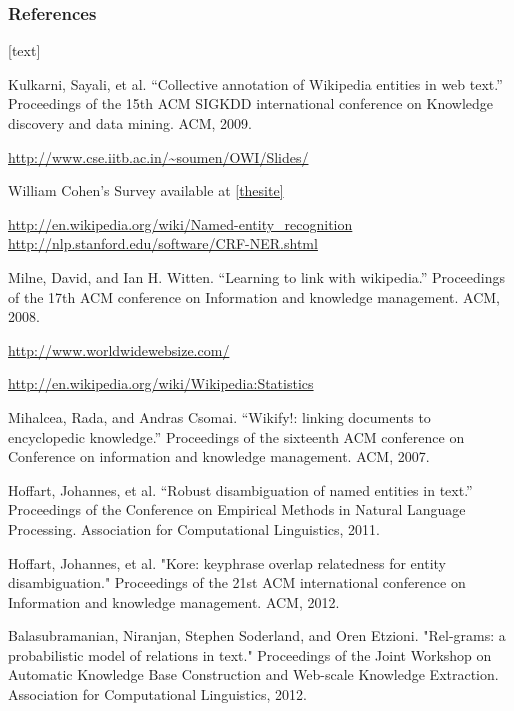 
\begin{frame}[allowframebreaks]
\frametitle{References}
[text]
\begin{thebibliography}{9}

 \label{thepaper} Kulkarni, Sayali, et al. ``Collective annotation of Wikipedia entities in web text.'' Proceedings of the 15th ACM SIGKDD international conference on Knowledge discovery and data mining. ACM, 2009.

  \label{thesite} \url{http://www.cse.iitb.ac.in/~soumen/OWI/Slides/}

 \label{thesurvey} William Cohen's Survey available at \ref{thesite}

 \label{thewiki} \url{http://en.wikipedia.org/wiki/Named-entity_recognition}
 \label{stanfordner} \url{http://nlp.stanford.edu/software/CRF-NER.shtml}


\label{mw}
Milne, David, and Ian H. Witten. ``Learning to link with wikipedia.'' Proceedings of the 17th ACM conference on Information and knowledge management. ACM, 2008.

 \label{ws} \url{http://www.worldwidewebsize.com/}

 \label{wikistats} \url{http://en.wikipedia.org/wiki/Wikipedia:Statistics}

 \label{wikify}
Mihalcea, Rada, and Andras Csomai. ``Wikify!: linking documents to encyclopedic knowledge.'' Proceedings of the sixteenth ACM conference on Conference on information and knowledge management. ACM, 2007.

 \label{aida}
Hoffart, Johannes, et al. ``Robust disambiguation of named entities in text.'' Proceedings of the Conference on Empirical Methods in Natural Language Processing. Association for Computational Linguistics, 2011.

 \label{kpsim}
Hoffart, Johannes, et al. "Kore: keyphrase overlap relatedness for entity disambiguation." Proceedings of the 21st ACM international conference on Information and knowledge management. ACM, 2012.

 \label{relgram}
Balasubramanian, Niranjan, Stephen Soderland, and Oren Etzioni. "Rel-grams: a probabilistic model of relations in text." Proceedings of the Joint Workshop on Automatic Knowledge Base Construction and Web-scale Knowledge Extraction. Association for Computational Linguistics, 2012.


\end{thebibliography}
\end{frame}
